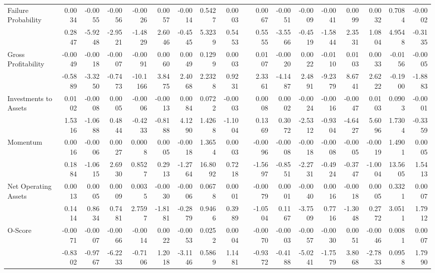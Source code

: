 \begin{table}[h]
{\begin{tabular}{lrrrrrrrrrrrrrrrrr}
      Failure Probability & 0.0034 & -0.0055 & -0.0056 & -0.0026 & 0.0057 & -0.0014 & 0.5427 & 0.0003 &       & 0.0067 & -0.0051 & -0.0009 & -0.0041 & 0.0099 & 0.0032 & 0.7084 & -0.0002 \\
            & 0.2847 & -5.9248 & -2.9521 & -1.4829 & 2.6046 & -0.4545 & 5.3239 & 0.5453 &       & 0.5555 & -3.5566 & -0.4519 & -1.5844 & 2.3531 & 1.0804 & 4.9548 & -0.3135 \\
      Gross Profitability & -0.0049 & -0.0018 & -0.0007 & -0.0091 & 0.0060 & 0.0049 & 0.1299 & 0.0003 &       & 0.0107 & -0.0020 & 0.0022 & -0.0110 & 0.0103 & 0.0033 & -0.0156 & -0.0005 \\
            & -0.5889 & -3.3250 & -0.7473 & -10.1166 & 3.8475 & 2.4068 & 2.2328 & 0.9231 &       & 2.3361 & -4.1487 & 2.4891 & -9.2379 & 8.6741 & 2.6222 & -0.1900 & -1.8883 \\
      Investments to Assets & 0.0102 & -0.0008 & 0.0005 & -0.0006 & -0.0013 & 0.0084 & 0.0722 & -0.0003 &       & 0.0008 & 0.0002 & -0.0024 & -0.0016 & -0.0047 & 0.0103 & 0.0903 & -0.0001 \\
            & 1.5316 & -1.0688 & 0.4844 & -0.4233 & -0.8188 & 4.1290 & 1.4268 & -1.1004 &       & 0.1369 & 0.3072 & -2.5312 & -0.9304 & -4.6427 & 5.6096 & 1.7304 & -0.3359 \\
      Momentum & 0.0016 & -0.0006 & 0.0027 & 0.0008 & 0.0005 & -0.0018 & 1.3654 & 0.0003 &       & -0.0096 & -0.0008 & -0.0018 & -0.0008 & -0.0005 & -0.0019 & 1.4901 & 0.0005 \\
            & 0.1884 & -1.0615 & 2.6930 & 0.8527 & 0.2913 & -1.2764 & 16.8092 & 0.7218 &       & -1.5697 & -0.8551 & -2.2731 & -0.4924 & -0.3747 & -1.0004 & 13.5605 & 1.5413 \\
      Net Operating Assets & 0.0013 & 0.0005 & 0.0009 & 0.0035 & -0.0030 & -0.0006 & 0.0678 & 0.0001 &       & -0.0079 & 0.0001 & -0.0040 & 0.0016 & -0.0018 & 0.0005 & 0.3321 & 0.0007 \\
            & 0.1414 & 0.8634 & 0.7481 & 2.7597 & -1.8181 & -0.2879 & 0.9466 & 0.3989 &       & -1.0504 & 0.1167 & -3.7509 & 0.7716 & -1.3048 & 0.2772 & 3.0511 & 1.7912 \\
      O-Score & -0.0071 & -0.0007 & -0.0066 & -0.0014 & 0.0022 & -0.0053 & 0.0252 & 0.0004 &       & -0.0070 & -0.0003 & -0.0057 & -0.0030 & 0.0051 & -0.0046 & 0.0081 & 0.0007 \\
            & -0.8302 & -0.9767 & -6.2233 & -0.7106 & 1.2018 & -3.1146 & 0.5869 & 1.1481 &       & -0.9372 & -0.4188 & -5.0241 & -1.7579 & 3.8068 & -2.7833 & 0.0958 & 1.7990 \\

\end{tabular}}
\end{table}
